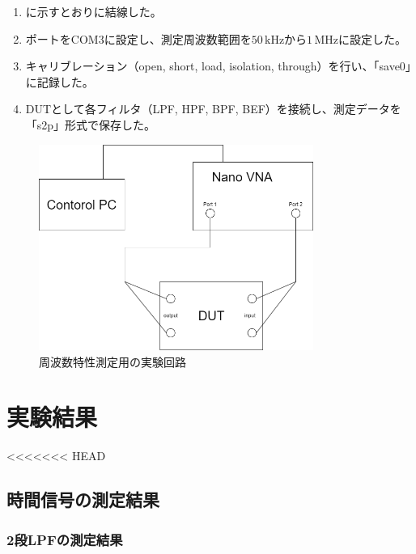 \documentclass[11pt,dvipdfmx]{jarticle}
\begin{document}
\begin{enumerate}
  \item {}に示すとおりに結線した。
  \item ポートをCOM3に設定し、測定周波数範囲を$50\,\mathrm{kHz}$から$1\,\mathrm{MHz}$に設定した。
  \item キャリブレーション（open, short, load, isolation, through）を行い、「save0」に記録した。
  \item DUTとして各フィルタ（LPF, HPF, BPF, BEF）を接続し、測定データを「s2p」形式で保存した。
\end{enumerate}
\begin{figure}[H]
  \centering
  \includegraphics[width=0.8\textwidth]{fig/VNA.drawio.png}
  \caption{周波数特性測定用の実験回路}
  \label{fig:実験回路2}
\end{figure}

\section{実験結果}
<<<<<<< HEAD
\subsection{時間信号の測定結果}

\subsubsection{2段LPFの測定結果}
\end{document}
